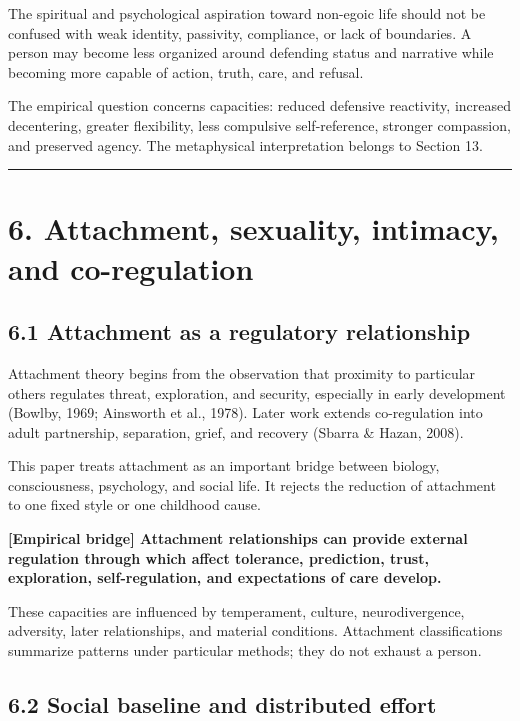 \documentclass[
  11pt,
]{article}
\begin{document}
The spiritual and psychological aspiration toward non-egoic life should
not be confused with weak identity, passivity, compliance, or lack of
boundaries. A person may become less organized around defending status
and narrative while becoming more capable of action, truth, care, and
refusal.

The empirical question concerns capacities: reduced defensive
reactivity, increased decentering, greater flexibility, less compulsive
self-reference, stronger compassion, and preserved agency. The
metaphysical interpretation belongs to Section 13.

\begin{center}\rule{0.5\linewidth}{0.5pt}\end{center}

\section{6. Attachment, sexuality, intimacy, and
co-regulation}\label{attachment-sexuality-intimacy-and-co-regulation}

\subsection{6.1 Attachment as a regulatory
relationship}\label{attachment-as-a-regulatory-relationship}

Attachment theory begins from the observation that proximity to
particular others regulates threat, exploration, and security,
especially in early development (Bowlby, 1969; Ainsworth et al., 1978).
Later work extends co-regulation into adult partnership, separation,
grief, and recovery (Sbarra \& Hazan, 2008).

This paper treats attachment as an important bridge between biology,
consciousness, psychology, and social life. It rejects the reduction of
attachment to one fixed style or one childhood cause.

\textbf{{[}Empirical bridge{]} Attachment relationships can provide
external regulation through which affect tolerance, prediction, trust,
exploration, self-regulation, and expectations of care develop.}

These capacities are influenced by temperament, culture,
neurodivergence, adversity, later relationships, and material
conditions. Attachment classifications summarize patterns under
particular methods; they do not exhaust a person.

\subsection{6.2 Social baseline and distributed
effort}\label{social-baseline-and-distributed-effort}
\end{document}
